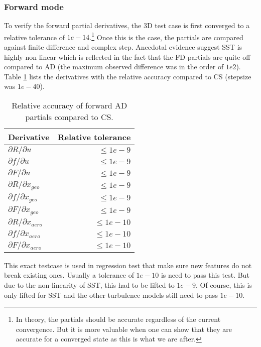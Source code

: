 \subsubsection{Forward mode}
\label{subsubsec:forward_ad}
To verify the forward partial derivatives, the 3D test case is first converged
to a relative tolerance of $1e-14$.\footnote{In theory, the partials should be
accurate regardless of the current convergence. But it is more valuable when
one can show that they are accurate for a converged state as this is what we
are after. } Once this is the case, the partials are compared against finite
difference and complex step. Anecdotal evidence suggest SST is highly
non-linear which is reflected in the fact that the FD partials are quite off
compared to AD (the maximum observed difference was in the order of $1e2$).
Table \ref{tab:partials_forward} lists the derivatives with the relative
accuracy compared to CS (stepsize was $1e-40$). 
\begin{table}[H]
    \centering
    \begin{tabular}{l r}
        \toprule
        Derivative                          & Relative tolerance \\
        \toprule
        $\partial R / \partial u$           & $\leq 1e-9$ \\
        $\partial f / \partial u$           & $\leq 1e-9$ \\
        $\partial F / \partial u$           & $\leq 1e-9$ \\
        \midrule
        $\partial R / \partial x_{geo}$     & $\leq 1e-9$ \\
        $\partial f / \partial x_{geo}$     & $\leq 1e-9$ \\
        $\partial F / \partial x_{geo}$     & $\leq 1e-9$ \\
        \midrule
        $\partial R / \partial x_{aero}$    & $\leq 1e-10$ \\
        $\partial f / \partial x_{aero}$    & $\leq 1e-10$ \\
        $\partial F / \partial x_{aero}$    & $\leq 1e-10$ \\
        \bottomrule
    \end{tabular}
    \caption{Relative accuracy of forward AD partials compared to CS.}
    \label{tab:partials_forward}
\end{table}

\noindent This exact testcase is used in regression test that make sure new
features do not break existing ones. Usually a tolerance of $1e-10$ is need to
pass this test. But due to the non-linearity of SST, this had to be lifted to
$1e-9$. Of course, this is only lifted for SST and the other turbulence models
still need to pass $1e-10$.


